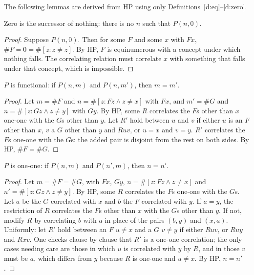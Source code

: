 \documentclass{situationist-preprint}
\begin{document}
The following lemmas are derived from HP using only Definitions~\ref{d:eq}--\ref{d:zero}.

\begin{lemma}\label{l:zero}
Zero is the successor of nothing: there is no $n$ such that $P(n, 0)$.
\end{lemma}

\begin{proof}
Suppose $P(n, 0)$. Then for some $F$ and some $x$ with $Fx$, $\#F = 0 = \#[z : z \neq z]$. By HP, $F$ is equinumerous with a concept under which nothing falls. The correlating relation must correlate $x$ with something that falls under that concept, which is impossible.
\end{proof}

\begin{lemma}\label{l:func}
$P$ is functional: if $P(n, m)$ and $P(n, m')$, then $m = m'$.
\end{lemma}

\begin{proof}
Let $m = \#F$ and $n = \#[z : Fz \wedge z \neq x]$ with $Fx$, and $m' = \#G$ and $n = \#[z : Gz \wedge z \neq y]$ with $Gy$. By HP, some $R$ correlates the $F$s other than $x$ one-one with the $G$s other than $y$. Let $R'$ hold between $u$ and $v$ if either $u$ is an $F$ other than $x$, $v$ a $G$ other than $y$ and $Ruv$, or $u = x$ and $v = y$. $R'$ correlates the $F$s one-one with the $G$s: the added pair is disjoint from the rest on both sides. By HP, $\#F = \#G$.
\end{proof}

\begin{lemma}\label{l:inj}
$P$ is one-one: if $P(n, m)$ and $P(n', m)$, then $n = n'$.
\end{lemma}

\begin{proof}
Let $m = \#F = \#G$, with $Fx$, $Gy$, $n = \#[z : Fz \wedge z \neq x]$ and $n' = \#[z : Gz \wedge z \neq y]$. By HP, some $R$ correlates the $F$s one-one with the $G$s. Let $a$ be the $G$ correlated with $x$ and $b$ the $F$ correlated with $y$. If $a = y$, the restriction of $R$ correlates the $F$s other than $x$ with the $G$s other than $y$. If not, modify $R$ by correlating $b$ with $a$ in place of the pairs $(b, y)$ and $(x, a)$. Uniformly: let $R'$ hold between an $F$ $u \neq x$ and a $G$ $v \neq y$ if either $Ruv$, or $Ruy$ and $Rxv$. One checks clause by clause that $R'$ is a one-one correlation; the only cases needing care are those in which $u$ is correlated with $y$ by $R$, and in those $v$ must be $a$, which differs from $y$ because $R$ is one-one and $u \neq x$. By HP, $n = n'$.
\end{proof}
\end{document}
